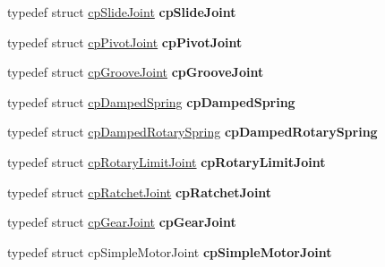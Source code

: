 \begin{DoxyCompactItemize}
\mbox{\label{group__misc_ga22c80982fc779df42ada48f0f35c326c}} 
typedef struct \mbox{\hyperlink{structcp_slide_joint}{cp\+Slide\+Joint}} {\bfseries cp\+Slide\+Joint}
\item 
\mbox{\label{group__misc_ga6be42317226c36d7c3b71175c31bed55}} 
typedef struct \mbox{\hyperlink{structcp_pivot_joint}{cp\+Pivot\+Joint}} {\bfseries cp\+Pivot\+Joint}
\item 
\mbox{\label{group__misc_ga4aa4733fb7b33f6650ce92a7d2bf9361}} 
typedef struct \mbox{\hyperlink{structcp_groove_joint}{cp\+Groove\+Joint}} {\bfseries cp\+Groove\+Joint}
\item 
\mbox{\label{group__misc_gab4c3629bf0daa6e27aaff6ac1bdc0fb7}} 
typedef struct \mbox{\hyperlink{structcp_damped_spring}{cp\+Damped\+Spring}} {\bfseries cp\+Damped\+Spring}
\item 
\mbox{\label{group__misc_ga48602f8d634857dac76e75f05458aea1}} 
typedef struct \mbox{\hyperlink{structcp_damped_rotary_spring}{cp\+Damped\+Rotary\+Spring}} {\bfseries cp\+Damped\+Rotary\+Spring}
\item 
\mbox{\label{group__misc_ga54615af04b79ce2b9f2dfedc8e702da3}} 
typedef struct \mbox{\hyperlink{structcp_rotary_limit_joint}{cp\+Rotary\+Limit\+Joint}} {\bfseries cp\+Rotary\+Limit\+Joint}
\item 
\mbox{\label{group__misc_ga574d87330384b10b88666948ea424a50}} 
typedef struct \mbox{\hyperlink{structcp_ratchet_joint}{cp\+Ratchet\+Joint}} {\bfseries cp\+Ratchet\+Joint}
\item 
\mbox{\label{group__misc_gac590a81b11f1ee5ae26108e24a5b6074}} 
typedef struct \mbox{\hyperlink{structcp_gear_joint}{cp\+Gear\+Joint}} {\bfseries cp\+Gear\+Joint}
\item 
\mbox{\label{group__misc_ga946a6726ce9067b29e944ff0f9309120}} 
typedef struct cp\+Simple\+Motor\+Joint {\bfseries cp\+Simple\+Motor\+Joint}
\item 
\mbox{\label{group__misc_gad27db8fe21c73da2f139b0f28ded9818}} 

\end{DoxyCompactItemize}
